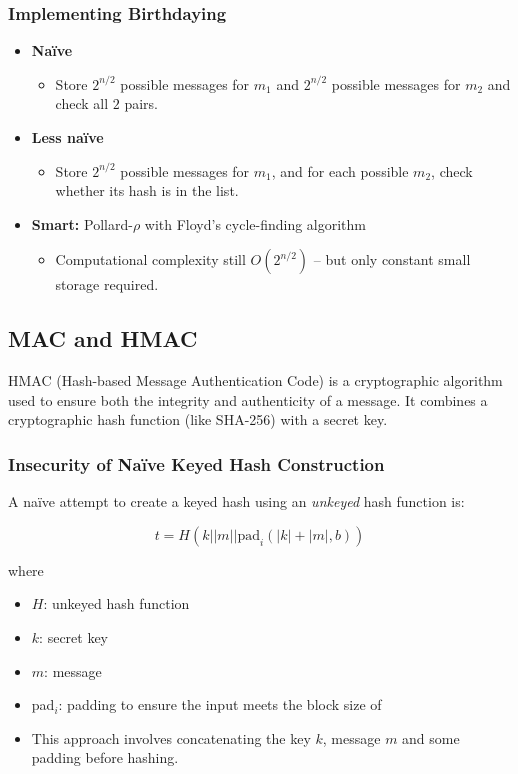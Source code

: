 \subsubsection{Implementing Birthdaying}
\begin{itemize}
    \item \textbf{Naïve}
    \begin{itemize}
        \item Store \( 2^{n/2} \) possible messages for \( m_1 \) and \( 2^{n/2} \) possible messages for \( m_2 \) and check all \( 2 \) pairs.
    \end{itemize}
    
    \item \textbf{Less naïve}
    \begin{itemize}
        \item Store \( 2^{n/2} \) possible messages for \( m_1 \), and for each possible \( m_2 \), check whether its hash is in the list.
    \end{itemize}
    
    \item \textbf{Smart:} Pollard-\(\rho\) with Floyd’s cycle-finding algorithm
    \begin{itemize}
        \item Computational complexity still \( O(2^{n/2}) \) – but only constant small storage required.
    \end{itemize}
\end{itemize}

\subsection{MAC and HMAC}
HMAC (Hash-based Message Authentication Code) is a cryptographic algorithm used to ensure both the integrity and authenticity of a message. 
It combines a cryptographic hash function (like SHA-256) with a secret key.

\subsubsection{Insecurity of Naïve Keyed Hash Construction}
A naïve attempt to create a keyed hash using an \emph{unkeyed} hash function is:

\[ t=H(k|| m || \text{pad}_i(|k|+|m|,b)) \]

where
\begin{itemize}
    \item $H$: unkeyed hash function
    \item $k$: secret key
    \item $m$: message
    \item pad$_i$: padding to ensure the input meets the block size of 
    \item This approach involves concatenating the key $k$, message $m$ and some padding before hashing.
\end{itemize}

